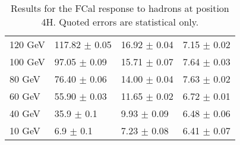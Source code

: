 \begin{table}[!htb]
\begin{center}
\begin{tabular}{|l|l|l|l|}
120 GeV  &  117.82 $\pm$    0.05 &   16.92 $\pm$    0.04 &    7.15 $\pm$    0.02 \\
100 GeV  &   97.05 $\pm$    0.09 &   15.71 $\pm$    0.07 &    7.64 $\pm$    0.03 \\
80 GeV  &   76.40 $\pm$    0.06 &   14.00 $\pm$    0.04 &    7.63 $\pm$    0.02 \\
60 GeV  &   55.90 $\pm$    0.03 &   11.65 $\pm$    0.02 &    6.72 $\pm$    0.01 \\
40 GeV  &   35.9 $\pm$    0.1 &    9.93 $\pm$    0.09 &    6.48 $\pm$    0.06 \\
10 GeV  &    6.9 $\pm$    0.1 &    7.23 $\pm$    0.08 &    6.41 $\pm$    0.07 \\
\hline
\end{tabular}
\end{center}
\caption[Hadron response, 4H]{Results for the FCal response to hadrons at position 4H. Quoted errors are statistical only.}
\label{TBres_table_hadron_4H}
\end{table}
